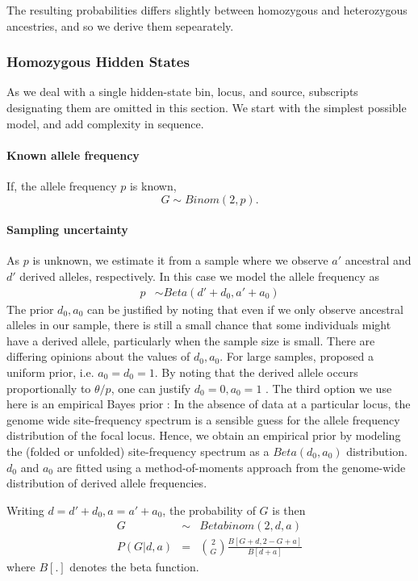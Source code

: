 \documentclass[10pt,a4paper]{article}
\begin{document}
  The resulting probabilities differs slightly between homozygous and heterozygous ancestries, and so we derive them sepearately.

\subsubsection*{Homozygous Hidden States}
As we deal with a single hidden-state bin, locus, and source, subscripts designating them are omitted in this section. We start with the simplest possible model, and add complexity in sequence.
\paragraph{Known allele frequency}
If, the allele frequency $p$ is known, 
\begin{equation}
G \sim Binom(2, p)\text{.}\nonumber
\end{equation}
\paragraph{Sampling uncertainty} As $p$ is unknown, we estimate it from a sample where we observe $a'$ ancestral and $d'$ derived alleles, respectively. In this case we model the allele frequency as
\begin{align}
p &\sim Beta(d' + d_0, a' + a_0) \nonumber
\end{align}
The prior $d_0, a_0$ can be justified by noting that even if we only observe ancestral alleles in our sample, there is still a small chance that some individuals might have a derived allele, particularly when the sample size is small. There are differing opinions about the values of $d_0, a_0$. For large samples, \citet{balding1995} proposed a uniform prior, i.e. $a_0=d_0=1$. By noting that the derived allele occurs proportionally to $\theta/p$, one can justify $d_0=0, a_0=1$ \citep{racimo2016}. The third option we use here is an empirical Bayes prior \citep{efron2012}: In the absence of data at a particular locus, the genome wide site-frequency spectrum is a sensible guess for the allele frequency distribution of the focal locus. Hence, we obtain an empirical prior by modeling the (folded or unfolded) site-frequency spectrum as a $Beta(d_0, a_0)$ distribution. $d_0$ and $a_0$ are fitted using a method-of-moments approach from the genome-wide distribution of derived allele frequencies.

Writing $d = d' + d_0, a = a'+a_0$, the probability of $G$ is then
\begin{eqnarray}
G &\sim& Betabinom(2, d, a)\nonumber\\
P(G | d, a)&=& \binom{2}{G} \frac{B[G+d, 2-G + a]}{B[ d + a]} \label{eq:ll:homo}
\end{eqnarray}
where $B[.]$ denotes the beta function.
\end{document}
